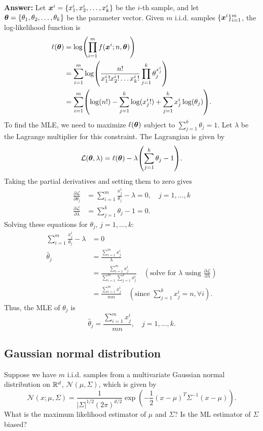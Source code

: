 \documentclass{article}
\begin{document}
\textbf{Answer:}
Let $\bm{x}^{i} = \{x_1^{i}, x_2^{i}, \dots, x_k^{i}\}$ be the $i$-th sample, and let $\bm{\theta} = \{\theta_1, \theta_2, \dots, \theta_k\}$ be the parameter vector.
Given $m$ i.i.d. samples $\{\bm{x}^{i}\}_{i=1}^m$, the log-likelihood function is
\begin{align*}
\ell(\vct{\theta}) &= \log \left( \prod_{i=1}^m f(\vct{x}^{i} ; n,\vct{\theta}) \right) \\
&= \sum_{i=1}^m \log \left( \frac{n!}{x_1^{i}! x_2^{i}! \dots x_k^{i}!} \prod_{j=1}^k \theta_j^{x_j^{i}} \right) \\
&= \sum_{i=1}^m \left( \log(n!) - \sum_{j=1}^k \log(x_j^{i}!) + \sum_{j=1}^k x_j^{i} \log(\theta_j) \right).
\end{align*}
To find the MLE, we need to maximize $\ell(\bm{\theta})$ subject to $\sum_{j=1}^k \theta_j = 1$.
Let $\lambda$ be the Lagrange multiplier for this constraint.
The Lagrangian is given by
$$\mathcal{L}(\vct{\theta}, \lambda) = \ell(\vct{\theta}) - \lambda \left( \sum_{j=1}^k \theta_j - 1 \right).$$
Taking the partial derivatives and setting them to zero gives
\begin{align*}
\frac{\partial \mathcal{L}}{\partial \theta_j} &= \sum_{i=1}^m \frac{x_j^{i}}{\theta_j} - \lambda = 0, \quad j = 1, \dots, k \\
\frac{\partial \mathcal{L}}{\partial \lambda} &= \sum_{j=1}^k \theta_j - 1 = 0.
\end{align*}
Solving these equations for $\theta_j$, $j = 1, \dots, k$:
\begin{align*}
\sum_{i=1}^m \frac{x_j^{i}}{\theta_j} - \lambda &= 0 \\
\hat{\theta}_j &= \frac{\sum_{i=1}^m x_j^{i}}{\lambda} \\
&= \frac{\sum_{i=1}^m x_j^{i}}{\sum_{i=1}^m{\sum_{j=1}^k{x_j^i}}} \quad \left(\text{solve for } \lambda \text{ using } \frac{\partial \mathcal{L}}{\partial \lambda}\right) \\
&= \frac{\sum_{i=1}^m x_j^{i}}{m n} \quad \left(\text{since } \sum_{j=1}^k{x_j^i} = n, \forall i\right).
\end{align*}
Thus, the MLE of $\theta_j$ is
$$\hat{\theta}_j = \frac{\sum_{i=1}^{m} x_j^{i}}{m n}, \quad j = 1, \dots, k.$$

\subsection{Gaussian normal distribution}

Suppose we have $m$ i.i.d. samples from a multivariate Gaussian normal distribution on $\mathbb{R}^d$, $\mathcal{N}(\mu, \Sigma)$, which is given by
$$\mathcal{N}(x; \mu, \Sigma) = \frac{1}{|\Sigma|^{1/2}(2\pi)^{d/2}} \exp\left(-\frac{1}{2} (x-\mu)^T \Sigma^{-1} (x-\mu)\right).$$
What is the maximum likelihood estimator of $\mu$ and $\Sigma$?
Is the ML estimator of $\Sigma$ biased?
\end{document}
